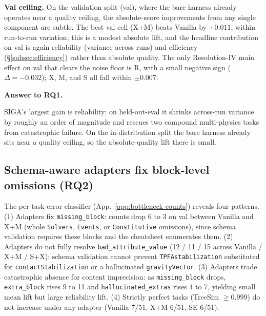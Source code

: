 \documentclass{article}
\newif\ifrqfancy
\newenvironment{rqanswer}[1]{%
  \ifrqfancy\begin{rqbox}\fi\noindent\textbf{Answer to #1.}\ %
}{%
  \ifrqfancy\end{rqbox}\else\par\smallskip\fi%
}
\begin{document}
\label{subsec:per-task}\textbf{Val ceiling.} On the validation split (val), where the bare harness already operates near a quality ceiling, the absolute-score improvements from any single component are subtle. The best val cell (X+M) beats Vanilla by $+0.011$, within run-to-run variation; this is a modest absolute lift, and the headline contribution on val is again reliability (variance across runs) and efficiency (\S\ref{subsec:efficiency}) rather than absolute quality. The only Resolution-IV main effect on val that clears the noise floor is R, with a small negative sign ($\Delta = -0.032$); X, M, and S all fall within $\pm 0.007$.

\begin{rqanswer}{RQ1}
SIGA's largest gain is reliability: on held-out-eval it shrinks across-run variance by roughly an order of magnitude and rescues two compound multi-physics tasks from catastrophic failure. On the in-distribution split the bare harness already sits near a quality ceiling, so the absolute-quality lift there is small.
\end{rqanswer}

\subsection{Schema-aware adapters fix block-level omissions (RQ2)}
\label{subsec:bottleneck-results}

The per-task error classifier (App.~\ref{app:bottleneck-counts}) reveals four patterns. (1) Adapters fix \texttt{missing\_block}: counts drop 6 to 3 on val between Vanilla and X+M (whole \texttt{Solvers}, \texttt{Events}, or \texttt{Constitutive} omissions), since schema validation requires these blocks and the cheatsheet enumerates them. (2) Adapters do not fully resolve \texttt{bad\_attribute\_value} (12 / 11 / 15 across Vanilla / X+M / S+X): schema validation cannot prevent \texttt{TPFAstabilization} substituted for \texttt{contactStabilization} or a hallucinated \texttt{gravityVector}. (3) Adapters trade catastrophic absence for content imprecision: as \texttt{missing\_block} drops, \texttt{extra\_block} rises 9 to 11 and \texttt{hallucinated\_extras} rises 4 to 7, yielding small mean lift but large reliability lift. (4) Strictly perfect tasks (TreeSim $\geq 0.999$) do not increase under any adapter (Vanilla 7/51, X+M 6/51, SE 6/51).
\end{document}
